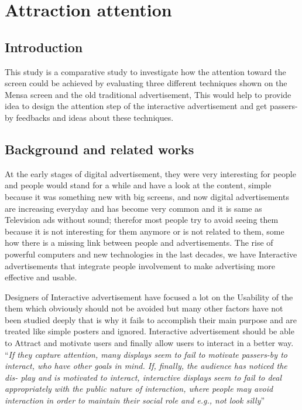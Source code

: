 \newcommand{\hilight}[1]{\colorbox{yellow}{#1}}

\chapter{Attraction attention} %

\label{Chapter3} %


\section{Introduction}
This study is a comparative study to investigate how the attention toward the screen could be achieved by evaluating three different techniques shown on the Mensa screen and the old traditional advertisement, This would help to provide idea to design the attention step of the interactive advertisement and get passers-by feedbacks and ideas about these techniques.

\section{Background and related works}
At the early stages of digital advertisement, they were very interesting for people and people would stand for a while and have a look at the content, simple because it was something new with big screens, and now digital advertisements are increasing everyday and has become very common and it is same as Television ads without sound; therefor most people try to avoid seeing them because it is not interesting for them anymore or is not related to them, some how there is a missing link between people and advertisements. The rise of powerful computers and new technologies in the last decades, we have Interactive advertisements that integrate people involvement to make advertising more effective and usable.

Designers of Interactive advertisement have focused a lot on the Usability of the them which obviously should not be avoided but many other factors have not been studied deeply that is why it fails to accomplish their main purpose and are treated like simple posters and ignored. Interactive advertisement should be able to Attract and motivate users and finally allow users to interact in a better way. ``\emph{If they capture attention, many displays seem to fail to motivate passers-by to interact, who have other goals in mind. If, finally, the audience has noticed the dis- play and is motivated to interact, interactive displays seem to fail to deal appropriately with the public nature of interaction, where people may avoid interaction in order to maintain their social role and e.g., not look silly}''\cite{DesignSpace}

